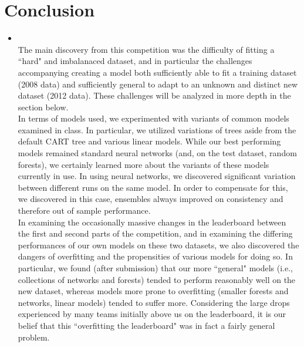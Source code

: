 \section{Conclusion}
\medskip
\begin{itemize}

    \item {} \\
    The main discovery from this competition was the difficulty of fitting a ``hard" and imbalanaced dataset, and in particular the challenges accompanying creating a model both sufficiently able to fit a training dataset (2008 data) and sufficiently general to adapt to an unknown and distinct new dataset (2012 data). These challenges will be analyzed in more depth in the section below. \\

    In terms of models used, we experimented with variants of common models examined in class. In particular, we utilized variations of trees aside from the default CART tree and various linear models. While our best performing models remained standard neural networks (and, on the test dataset, random forests), we certainly learned more about the variants of these models currently in use. In using neural networks, we discovered significant variation between different runs on the same model. In order to compensate for this, we discovered in this case, ensembles always improved on consistency and therefore out of sample performance. \\

    In examining the occasionally massive changes in the leaderboard between the first and second parts of the competition, and in examining the differing performances of our own models on these two datasets, we also discovered the dangers of overfitting and the propensities of various models for doing so. In particular, we found (after submission) that our more ``general" models (i.e., collections of networks and forests) tended to perform reasonably well on the new dataset, whereas models more prone to overfitting (smaller forests and networks, linear models) tended to suffer more. Considering the large drops experienced by many teams initially above us on the leaderboard, it is our belief that this ``overfitting the leaderboard" was in fact a fairly general problem.


\end{itemize}
